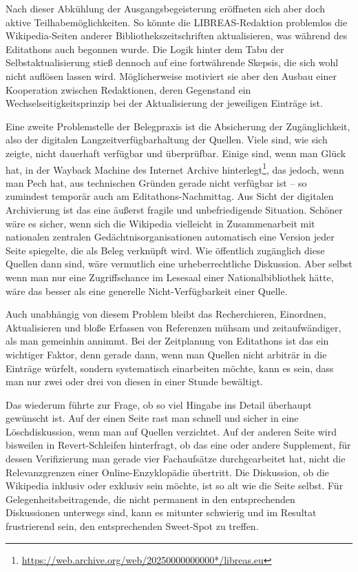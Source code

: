 \documentclass[a4paper,
fontsize=11pt,
oneside,
numbers=noperiodatend,
parskip=half-,
bibliography=totoc,
final
]{scrartcl}
\begin{document}
Nach dieser Abkühlung der Ausgangsbegeisterung eröffneten sich aber doch
aktive Teilhabemöglichkeiten. So könnte die LIBREAS-Redaktion problemlos
die Wikipedia-Seiten anderer Bibliothekszeitschriften aktualisieren, was
während des Editathons auch begonnen wurde. Die Logik hinter dem Tabu
der Selbstaktualisierung stieß dennoch auf eine fortwährende Skepsis,
die sich wohl nicht auflösen lassen wird. Möglicherweise motiviert sie
aber den Ausbau einer Kooperation zwischen Redaktionen, deren Gegenstand
ein Wechselseitigkeitsprinzip bei der Aktualisierung der jeweiligen
Einträge ist.

Eine zweite Problemstelle der Belegpraxis ist die Absicherung der
Zugänglichkeit, also der digitalen Langzeitverfügbarhaltung der Quellen.
Viele sind, wie sich zeigte, nicht dauerhaft verfügbar und überprüfbar.
Einige sind, wenn man Glück hat, in der Wayback Machine des Internet
Archive hinterlegt\footnote{\url{https://web.archive.org/web/20250000000000*/libreas.eu}},
das jedoch, wenn man Pech hat, aus technischen Gründen gerade nicht
verfügbar ist -- so zumindest temporär auch am Editathons-Nachmittag.
Aus Sicht der digitalen Archivierung ist das eine äußerst fragile und
unbefriedigende Situation. Schöner wäre es sicher, wenn sich die
Wikipedia vielleicht in Zusammenarbeit mit nationalen zentralen
Gedächtnisorganisationen automatisch eine Version jeder Seite spiegelte,
die als Beleg verknüpft wird. Wie öffentlich zugänglich diese Quellen
dann sind, wäre vermutlich eine urheberrechtliche Diskussion. Aber
selbst wenn man nur eine Zugriffschance im Lesesaal einer
Nationalbibliothek hätte, wäre das besser als eine generelle
Nicht-Verfügbarkeit einer Quelle.

Auch unabhängig von diesem Problem bleibt das Recherchieren, Einordnen,
Aktualisieren und bloße Erfassen von Referenzen mühsam und
zeitaufwändiger, als man gemeinhin annimmt. Bei der Zeitplanung von
Editathons ist das ein wichtiger Faktor, denn gerade dann, wenn man
Quellen nicht arbiträr in die Einträge würfelt, sondern systematisch
einarbeiten möchte, kann es sein, dass man nur zwei oder drei von diesen
in einer Stunde bewältigt.

Das wiederum führte zur Frage, ob so viel Hingabe ins Detail überhaupt
gewünscht ist. Auf der einen Seite rast man schnell und sicher in eine
Löschdiskussion, wenn man auf Quellen verzichtet. Auf der anderen Seite
wird bisweilen in Revert-Schleifen hinterfragt, ob das eine oder andere
Supplement, für dessen Verifizierung man gerade vier Fachaufsätze
durchgearbeitet hat, nicht die Relevanzgrenzen einer Online-Enzyklopädie
übertritt. Die Diskussion, ob die Wikipedia inklusiv oder exklusiv sein
möchte, ist so alt wie die Seite selbst. Für Gelegenheitsbeitragende,
die nicht permanent in den entsprechenden Diskussionen unterwegs sind,
kann es mitunter schwierig und im Resultat frustrierend sein, den
entsprechenden Sweet-Spot zu treffen.
\end{document}

